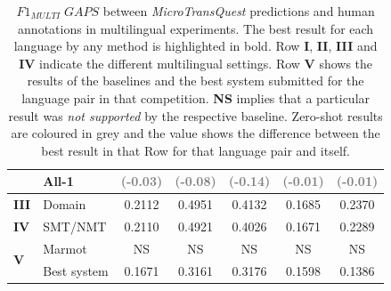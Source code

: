 \begin{table}[t]
\begin{center}
{\begin{tabular}{l l c c c c c}
				& All-1 & \textcolor{gray}{(-0.03)}  & \textcolor{gray}{(-0.08)} &  \textcolor{gray}{(-0.14)} & \textcolor{gray}{(-0.01)} & \textcolor{gray}{(-0.01)} \\
				\midrule
				\multirow{1}{*}{\bf III} & Domain & 0.2112  & 0.4951 &  0.4132 & 0.1685 & 0.2370  \\
				\midrule
				\multirow{1}{*}{\bf IV} & SMT/NMT & 0.2110  & 0.4921 &  0.4026 & 0.1671 & 0.2289 \\
				\midrule
				\multirow{2}{*}{\bf V} & Marmot & NS & NS & NS & NS & NS \\
				& Best system & 0.1671  & 0.3161 & 0.3176 & 0.1598 & 0.1386 \\
				\bottomrule
			\end{tabular}
		}
	\end{center}
	\caption[$F1_{\textit{MULTI}} \; GAPS$ between MicroTransQuest predictions and human annotations in multilingual experiments]{$F1_{\textit{MULTI}} \; GAPS$ between \textit{MicroTransQuest} predictions and human annotations in multilingual experiments. The best result for each language by any method is highlighted in bold. Row \textbf{I}, \textbf{II}, \textbf{III} and \textbf{IV} indicate the different multilingual settings. Row \textbf{V} shows the results of the baselines and the best system submitted for the language pair in that competition. \textbf{NS} implies that a particular result was \textit{not supported} by the respective baseline. Zero-shot results are coloured in grey and the value shows the difference between the best result in that Row for that language pair and itself.} 
	\label{tab:multilingual_gap_prediction}
\end{table}



